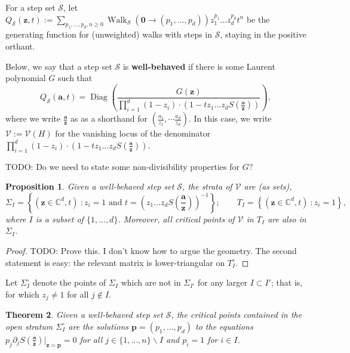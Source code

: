 \documentclass[A4,12pt]{article}
\newcommand{\<}{\left\langle}
\renewcommand{\>}{\right\rangle}
\newcommand{\steps}{\mathcal{S}}
\newcommand{\variety}{\mathcal{V}}
\newcommand{\z}{\mathbf{z}}
\renewcommand{\a}{\mathbf{a}}
\DeclareMathOperator{\Walk}{Walk}
\DeclareMathOperator{\Diag}{Diag}
\newcommand{\ds}{\displaystyle}
\newcommand{\ts}{\textstyle}
\newtheorem{theorem}{Theorem}
\newtheorem{proposition}[theorem]{Proposition}
\theoremstyle{definition}
\theoremstyle{example}
\begin{document}

For a step set $\steps$, let $Q_\steps(\z,t) := \ds\sum_{p_1,\dots, p_d, n\geq 0} \Walk_\steps(\mathbf{0}\to (p_1,\dots, p_d)) z_1^{p_1}\dots z_d^{p_d}t^n$ be the generating function for (unweighted) walks with steps in $\steps$, staying in the positive orthant. 

Below, we say that a step set $\steps$ is \textbf{well-behaved} if there is some Laurent polynomial $G$ such that
$$ Q_\steps(\a,t) = \Diag\left(\frac{G(\z)}{\prod_{i=1}^d (1-z_i) \cdot \left(1-tz_1\dots z_d S(\frac{\a}{\z}) \right)}\right), $$
where we write $\frac{\a}{\z}$ as as a shorthand for $(\frac{a_1}{z_1},\cdots\frac{a_d}{z_d})$. In this case, we write $\variety:=\variety(H)$ for the vanishing locus of the denominator $\prod_{i=1}^d (1-z_i) \cdot \left(1-tz_1\dots z_d S(\frac{\a}{\z}) \right)$.

TODO: Do we need to state some non-divisibility properties for $G$?

\begin{proposition}
Given a well-behaved step set $\steps$, the strata of $\variety$ are (as sets),
$$\Sigma_I = \left\{(\z\in\mathbb{C}^d,t)\ : z_i=1 \text{ and } t=\left(z_1\dots z_d S({\ts\frac{\a}{\z}})\right)^{-1} \right\}; \qquad T_I = \left\{(\z\in\mathbb{C}^d,t)\ : z_i=1 \right\}, $$
where $I$ is a subset of $\{1,\dots, d\}$. Moreover, all critical points of $\variety$ in $T_I$ are also in $\Sigma_I$.
\end{proposition}

\begin{proof}
TODO: Prove this. I don't know how to argue the geometry. The second statement is easy: the relevant matrix is lower-triangular on $T_I^\circ$.
\end{proof}

Let $\Sigma_I^\circ$ denote the points of $\Sigma_I$ which are not in $\Sigma_{I'}$ for any larger $I\subset I'$; that is, for which $z_j\neq 1$ for all $j\notin I$. 

\begin{theorem}
\label{thm:well-behaved-critical}
Given a well-behaved step set $\steps$, the critical points contained in the open stratum $\Sigma_I^\circ$ are the solutions $\mathbf{p}=(p_1,\dots, p_d)$ to the equations $p_j \partial_j S({\ts\frac{\a}{\z}})\Big\vert_{\z=\mathbf{p}}=0$ for all $j\in\{1,\dots,n\}\smallsetminus I$ and $p_i=1$ for $i\in I$.
\end{theorem}
\end{document}

